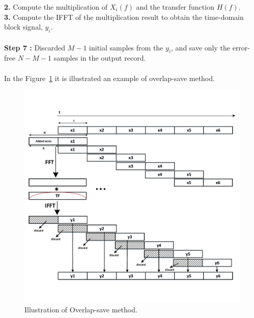 \textbf{2. }Compute the multiplication of $X_i(f)$ and the transfer function $H(f)$.\\
\textbf{3. }Compute the IFFT of the multiplication result to obtain the time-domain block signal, $y_i$.\\ \\
\textbf{ Step 7 :} Discarded $M-1$ initial samples from the $y_i$, and save only the error-free $N-M-1$ samples in the output record.\\ \\
In the Figure~\ref{overlapSave} it is illustrated an example of overlap-save method.
\begin{figure}[h]
	\centering
	\includegraphics[width=12cm]{./algorithms/overlap_save/figures/overlap-savev2.pdf}
	\caption{Illustration of Overlap-save method.}
	\label{overlapSave}
\end{figure}


